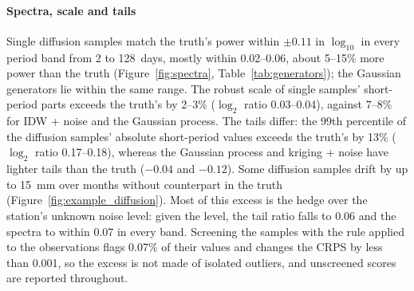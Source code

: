 \documentclass[preprint,12pt,authoryear]{elsarticle}
\begin{document}
\paragraph{Spectra, scale and tails} Single diffusion samples match the truth's power
within $\pm 0.11$ in $\log_{10}$ in every period band from 2 to 128~days, mostly within
0.02--0.06, about 5--15\% more power than the truth (Figure~\ref{fig:spectra},
Table~\ref{tab:generators}); the Gaussian generators lie within the same range. The
robust scale of single samples' short-period parts exceeds the truth's by 2--3\%
($\log_2$ ratio 0.03--0.04), against 7--8\% for IDW + noise and the Gaussian process. The
tails differ: the 99th percentile of the diffusion samples' absolute short-period values
exceeds the truth's by 13\% ($\log_2$ ratio 0.17--0.18), whereas the Gaussian process and
kriging + noise have lighter tails than the truth ($-0.04$ and $-0.12$). Some diffusion
samples drift by up to 15~mm over months without counterpart in the truth
(Figure~\ref{fig:example_diffusion}). Most of this excess is the hedge over the station's
unknown noise level: given the level, the tail ratio falls to 0.06 and the spectra to
within 0.07 in every band. Screening the samples with the rule applied to the
observations flags 0.07\% of their values and changes the CRPS by less than 0.001, so the
excess is not made of isolated outliers, and unscreened scores are reported throughout.
\end{document}
